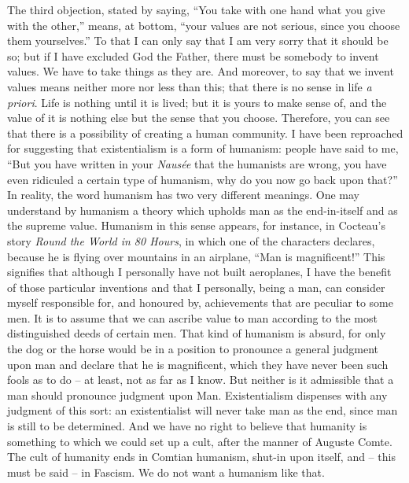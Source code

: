 \documentclass[12pt]{article}
\begin{document}
The third objection, stated by saying, “You take with one hand what you give with the other,” means, at bottom, “your values are not serious, since you choose them yourselves.” To that I can only say that I am very sorry that it should be so; but if I have excluded God the Father, there must be somebody to invent values. We have to take things as they are. And moreover, to say that we invent values means neither more nor less than this; that there is no sense in life \textit{a priori}. Life is nothing until it is lived; but it is yours to make sense of, and the value of it is nothing else but the sense that you choose. Therefore, you can see that there is a possibility of creating a human community. I have been reproached for suggesting that existentialism is a form of humanism: people have said to me, “But you have written in your \textit{Nausée} that the humanists are wrong, you have even ridiculed a certain type of humanism, why do you now go back upon that?” In reality, the word humanism has two very different meanings. One may understand by humanism a theory which upholds man as the end-in-itself and as the supreme value. Humanism in this sense appears, for instance, in Cocteau’s story \textit{Round the World in 80 Hours}, in which one of the characters declares, because he is flying over mountains in an airplane, “Man is magnificent!” This signifies that although I personally have not built aeroplanes, I have the benefit of those particular inventions and that I personally, being a man, can consider myself responsible for, and honoured by, achievements that are peculiar to some men. It is to assume that we can ascribe value to man according to the most distinguished deeds of certain men. That kind of humanism is absurd, for only the dog or the horse would be in a position to pronounce a general judgment upon man and declare that he is magnificent, which they have never been such fools as to do – at least, not as far as I know. But neither is it admissible that a man should pronounce judgment upon Man. Existentialism dispenses with any judgment of this sort: an existentialist will never take man as the end, since man is still to be determined. And we have no right to believe that humanity is something to which we could set up a cult, after the manner of Auguste Comte. The cult of humanity ends in Comtian humanism, shut-in upon itself, and – this must be said – in Fascism. We do not want a humanism like that.
\end{document}
